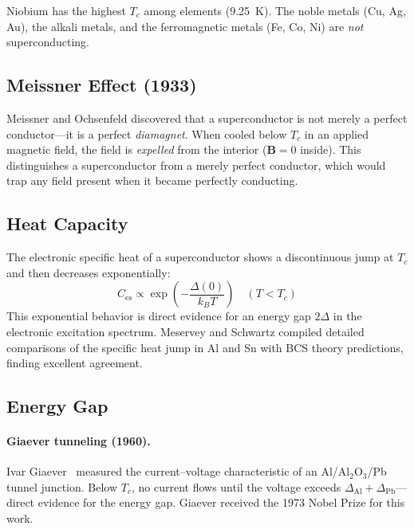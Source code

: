 Niobium has the highest $T_c$ among elements (\SI{9.25}{\kelvin}). The noble metals (Cu, Ag, Au), the alkali metals, and the ferromagnetic metals (Fe, Co, Ni) are \textit{not} superconducting.

\subsection{Meissner Effect (1933)}

Meissner and Ochsenfeld discovered that a superconductor is not merely a perfect conductor---it is a perfect \textit{diamagnet}. When cooled below $T_c$ in an applied magnetic field, the field is \textit{expelled} from the interior ($\mathbf{B} = 0$ inside). This distinguishes a superconductor from a merely perfect conductor, which would trap any field present when it became perfectly conducting.

\subsection{Heat Capacity}

The electronic specific heat of a superconductor shows a discontinuous jump at $T_c$ and then decreases exponentially:
\begin{equation}
  C_{\text{es}} \propto \exp\left(-\frac{\Delta(0)}{k_B T}\right) \quad (T < T_c)
\end{equation}
This exponential behavior is direct evidence for an energy gap $2\Delta$ in the electronic excitation spectrum. Meservey and Schwartz compiled detailed comparisons of the specific heat jump in Al and Sn with BCS theory predictions, finding excellent agreement.

\subsection{Energy Gap}

\paragraph{Giaever tunneling (1960).} Ivar Giaever~\cite{giaever1974nobel} measured the current--voltage characteristic of an Al/Al$_2$O$_3$/Pb tunnel junction. Below $T_c$, no current flows until the voltage exceeds $\Delta_{\text{Al}} + \Delta_{\text{Pb}}$---direct evidence for the energy gap. Giaever received the 1973 Nobel Prize for this work.

